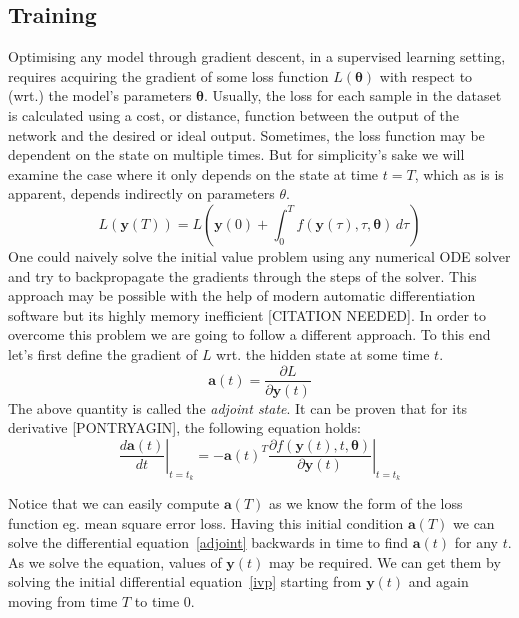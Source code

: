 \documentclass{article}
\begin{document}
    \subsection{Training}
    Optimising any model through gradient descent, in a supervised learning setting, requires acquiring the gradient of some loss function $L(\pmb{\theta})$ with respect to (wrt.) the model's parameters $\pmb{\theta}$.
    Usually, the loss for each sample in the dataset is calculated using a cost, or distance, function between the output of the network and the desired or ideal output.
    Sometimes, the loss function may be dependent on the state on multiple times.
    But for simplicity's sake we will examine the case where it only depends on the state at time $t=T$, which as is is apparent, depends indirectly on parameters $\theta$.
    \begin{equation}
        L(\pmb{y}(T)) = L \left( \pmb{y}(0) +\int_{0}^{T} f(\pmb{y}(\tau), \tau, \pmb{\theta}) \,d\tau \right) \label{ode_loss}
    \end{equation}
    One could naively solve the initial value problem using any numerical ODE solver and try to backpropagate the gradients through the steps of the solver.
    This approach may be possible with the help of modern automatic differentiation software but its highly memory inefficient [CITATION NEEDED]. In order to overcome this problem we are going to follow a different approach.
    To this end let's first define the gradient of $L$ wrt.
    the hidden state at some time $t$.
    \begin{equation}
        \pmb a(t) = \frac{\partial L}{\partial \pmb{y}(t) }
    \end{equation}
    The above quantity is called the \textit{adjoint state}.
    It can be proven that for its derivative [PONTRYAGIN], the following equation holds:
    \begin{equation}
        \left.
        \frac
        {d \pmb{a}(t)}
        {dt}
        \right|_{t=t_k}
        =
        - \pmb{a}(t)^T
        \left.
        \frac
        {\partial f( \pmb{y}(t), t, \pmb{\theta} )}
        {\partial \pmb{y}(t) }
        \right|_{t=t_k}
        \label{adjoint}
    \end{equation}

    Notice that we can easily compute $\pmb{a}(T)$ as we know the form of the loss function eg.
    mean square error loss.
    Having this initial condition $\pmb{a}(T)$ we can solve the differential equation~\eqref{adjoint} backwards in time to find $\pmb{a}(t)$ for any $t$.
    As we solve the equation, values of $\pmb{y}(t)$ may be required.
    We can get them by solving the initial differential equation~\eqref{ivp} starting from $\pmb{y}(t)$ and again moving from time $T$ to time $0$.
\end{document}
